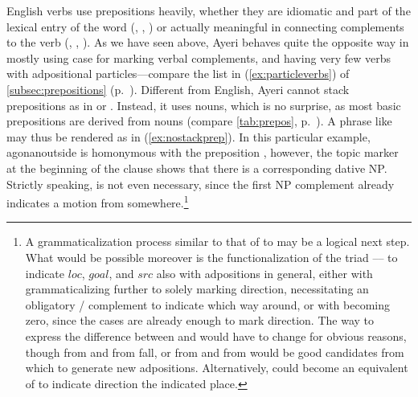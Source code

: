 English verbs use prepositions heavily, whether they are idiomatic and part of
the lexical entry of the word (, , ) or
actually meaningful in connecting complements to the verb (,
, ). As we have seen above, Ayeri behaves quite the
opposite way in mostly using case for marking verbal complements,
and having very few verbs with adpositional particles---compare the list in
(\ref{ex:particleverbs}) of \autoref{subsec:prepositions}
(p.~\pageref{ex:particleverbs}). Different from English, Ayeri cannot stack
prepositions as in  or . Instead, it uses nouns, which is no surprise, as most basic
prepositions are derived from nouns (compare \autoref{tab:prepos},
p.~\pageref{tab:prepos}). A phrase like  may thus be rendered
as in (\ref{ex:nostackprep}). In this particular example,
 {agonan}{outside} is homonymous with the preposition
, however, the topic marker at the beginning of
the clause shows that there is a corresponding dative NP. Strictly speaking,
 is not even necessary, since the first NP complement
already indicates a motion from somewhere.\footnote{A grammaticalization process
similar to that of  to
 may be a logical next step. What would be possible moreover is
the functionalization of the triad \Loc{}--\Dat{}--\Gen{} to indicate
$loc$, $goal$, and
$src$ also with adpositions in general, either with
 grammaticalizing further to solely marking direction,
necessitating an obligatory \Dat{}/\Gen{} complement to indicate which way
around, or with  becoming zero, since the cases are
already enough to mark direction.
%
%
The way to express the difference between  and 
would have to change for obvious reasons, though  from 
 and  from 
{fall}, or  from  and
 from  would be good candidates
from which to generate new adpositions. Alternatively,  could
become an equivalent of  to indicate direction  the
indicated place.
%
%
}

